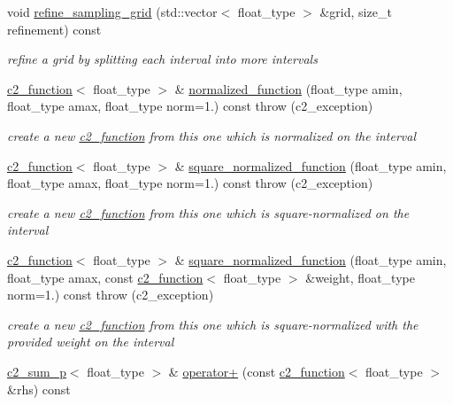 \begin{DoxyCompactItemize}
void \hyperlink{classc2__function_a25004cf23f56fafd0b64901354892f3c}{refine\-\_\-sampling\-\_\-grid} (std\-::vector$<$ float\-\_\-type $>$ \&grid, size\-\_\-t refinement) const 
\begin{DoxyCompactList}\small\item\em refine a grid by splitting each interval into more intervals \end{DoxyCompactList}\item 
\hyperlink{classc2__function}{c2\-\_\-function}$<$ float\-\_\-type $>$ \& \hyperlink{classc2__function_ad908929d3a8d8022caf4f3f1c65d5e71}{normalized\-\_\-function} (float\-\_\-type amin, float\-\_\-type amax, float\-\_\-type norm=1.) const   throw (c2\-\_\-exception)
\begin{DoxyCompactList}\small\item\em create a new \hyperlink{classc2__function}{c2\-\_\-function} from this one which is normalized on the interval \end{DoxyCompactList}\item 
\hyperlink{classc2__function}{c2\-\_\-function}$<$ float\-\_\-type $>$ \& \hyperlink{classc2__function_adcf8bcc841ca3a1155ae115178ea88af}{square\-\_\-normalized\-\_\-function} (float\-\_\-type amin, float\-\_\-type amax, float\-\_\-type norm=1.) const   throw (c2\-\_\-exception)
\begin{DoxyCompactList}\small\item\em create a new \hyperlink{classc2__function}{c2\-\_\-function} from this one which is square-\/normalized on the interval \end{DoxyCompactList}\item 
\hyperlink{classc2__function}{c2\-\_\-function}$<$ float\-\_\-type $>$ \& \hyperlink{classc2__function_a9d8716e8abb9e02a188c243f825acf9b}{square\-\_\-normalized\-\_\-function} (float\-\_\-type amin, float\-\_\-type amax, const \hyperlink{classc2__function}{c2\-\_\-function}$<$ float\-\_\-type $>$ \&weight, float\-\_\-type norm=1.) const   throw (c2\-\_\-exception)
\begin{DoxyCompactList}\small\item\em create a new \hyperlink{classc2__function}{c2\-\_\-function} from this one which is square-\/normalized with the provided {\itshape weight} on the interval \end{DoxyCompactList}\item 
\hyperlink{classc2__sum__p}{c2\-\_\-sum\-\_\-p}$<$ float\-\_\-type $>$ \& \hyperlink{classc2__function_a268b206b47c55e635e5f0a9e0f3e8ded}{operator+} (const \hyperlink{classc2__function}{c2\-\_\-function}$<$ float\-\_\-type $>$ \&rhs) const 

\end{DoxyCompactItemize}
